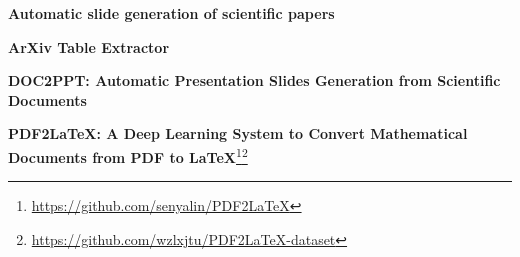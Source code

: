 \textbf{Automatic slide generation of scientific papers}\citep{Sefid:2019:K-CAP}

\textbf{ArXiv Table Extractor}\citep{Ramsay:2021:BachelorThesis}

\textbf{DOC2PPT: Automatic Presentation Slides Generation from Scientific Documents}\citep{Fu:2022:AAAI}

\textbf{PDF2LaTeX: A Deep Learning System to Convert Mathematical Documents from PDF to LaTeX}\citep{Wang:2020:DocEng}\footnote{\url{https://github.com/senyalin/PDF2LaTeX}}\footnote{\url{https://github.com/wzlxjtu/PDF2LaTeX-dataset}}
